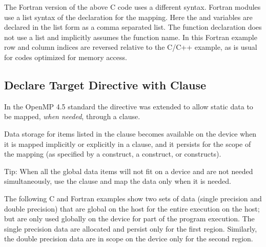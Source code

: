 
The Fortran version of the above C code uses a different syntax. Fortran modules 
use a list syntax of the  declaration for the mapping. 
Here the  and  variables are declared in the list form as a comma separated list. 
The function declaration does not use a list and implicitly assumes the function 
name. In this Fortran example row and column indices are reversed relative to the 
C/C++ example, as is usual for codes optimized for memory access.



\subsection{Declare Target Directive with  Clause}
\label{subsec:declare_target_link}




In the OpenMP 4.5 standard the  directive was extended to allow static
data to be mapped, \emph{when needed}, through a  clause.

Data storage for items listed in the  clause becomes available on the device
when it is mapped implicitly or explicitly in a  clause, and it persists for the scope of
the mapping (as specified by a  construct, 
a  construct, or 
 constructs).

Tip: When all the global data items will not fit on a device and are not needed
simultaneously, use the  clause and map the data only when it is needed.

The following C and Fortran examples show two sets of data (single precision and double precision)
that are global on the host for the entire execution on the host; but are only used
globally on the device for part of the program execution. The single precision data
are allocated and persist only for the first  region. Similarly, the
double precision data are in scope on the device only for the second  region.

